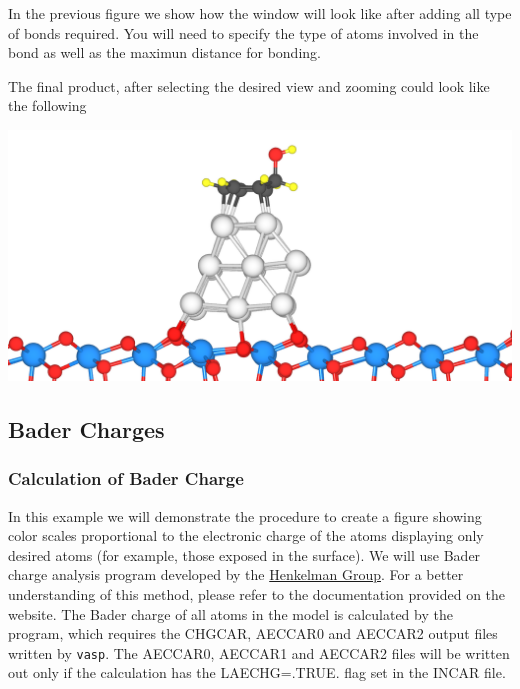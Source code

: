 \documentclass[11pt]{article}
\begin{document}
In the previous figure we show how the window will look like after adding all type of bonds required. You will need to specify the type of atoms involved in the bond as well as the maximun distance for bonding.

The final product, after selecting the desired view and zooming could look like the following

\begin{center}
\includegraphics[width=.9\linewidth]{./figures/VESTA/06_final_product.png}
\end{center}
\subsection{Bader Charges}
\label{sec:org9a86913}
\subsubsection{Calculation of Bader Charge}
\label{sec:orgcd35d58}
In this example we will demonstrate the procedure to create a figure showing color scales proportional to the electronic charge of the atoms displaying only desired atoms (for example, those exposed in the surface). We will use Bader charge analysis program developed by the \href{http://theory.cm.utexas.edu/henkelman/code/bader/}{Henkelman Group}. For a better understanding of this method, please refer to the documentation provided on the website. The Bader charge of all atoms in the model is calculated by the program, which requires the CHGCAR, AECCAR0 and AECCAR2 output files written by \texttt{vasp}. The AECCAR0, AECCAR1 and AECCAR2 files will be written out only if the calculation has the LAECHG=.TRUE. flag set in the INCAR file.  
\end{document}
